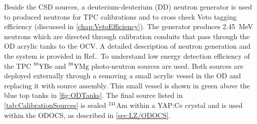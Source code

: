 Beside the CSD sources, a deuterium-deuterium (DD) neutron generator is used to produced neutrons for TPC calibrations and to cross check Veto tagging efficiency (discussed in \autoref{chap:VetoEfficiency}). The generator produces 2.45~MeV neutrons which are directed through calibration conduits that pass through the OD acrylic tanks to the OCV. A detailed description of neutron generation and the system is provided in Ref.\cite{LZ:2024bsz}. To understand low energy detection efficiency of the TPC $^{88}\text{YBe}$ and $^{88}\text{YMg}$ photo-neutron sources are used. Both sources are deployed externally through a removing a small acrylic vessel in the OD and replacing it with source assembly. This small vessel is shown in green above the blue top tanks in  \autoref{fig:ODTanks}.
The final source listed in \autoref{tab:CalibrationSources} is sealed $^{241}\text{Am}$ within a YAP:Ce crystal and is used within the ODOCS, as described in \autoref{sec:LZ/ODOCS}.

